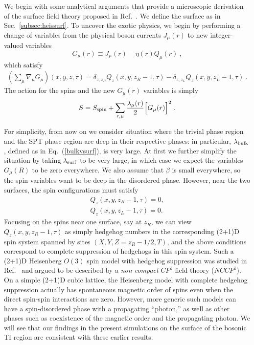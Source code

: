 We begin with some analytical arguments that provide a microscopic derivation of the surface field theory proposed in Ref.~\cite{SenthilVishwanath}.
We define the surface as in Sec.~\ref{subsec:heissurf}. To uncover the exotic physics, we begin by performing a change of variables from the physical boson currents $J_\mu(r)$ to new integer-valued variables
\begin{equation}
G_\mu(r) \equiv J_\mu(r) - \eta(r) Q_\mu(r) ~,
\label{Gchange}
\end{equation}
which satisfy 
\begin{eqnarray*}
\left(\sum_\mu \nabla_\mu G_\mu\right) (x, y, z, \tau) = 
\delta_{z, z_R} Q_z(x, y, z_R-1, \tau) 
- \delta_{z, z_L} Q_z(x, y, z_L-1, \tau) ~. 
\end{eqnarray*}
The action for the spins and the new $G_\mu(r)$ variables is simply
\begin{equation}
S = S_{\rm spin} + \sum_{r,\mu} \frac{\lambda_\mu(r)}{2} \Big[G_\mu(r)\Big]^2 ~.
\end{equation}

For simplicity, from now on we consider situation where the trivial phase region and the SPT phase region are deep in their respective phases: in particular, $\lambda_{\rm bulk}$, defined as in Eq.~(\ref{bulkvsurf}), is very large.  At first we further simplify the situation by taking $\lambda_{\rm surf}$ to be very large, in which case we expect the variables $G_\mu(R)$ to be zero everywhere.  We also assume that $\beta$ is small everywhere, so the spin variables want to be deep in the disordered phase.  However, near the two surfaces, the spin configurations must satisfy
\begin{equation}
\begin{array}{c}
Q_z(x, y, z_R-1, \tau) = 0, \\
Q_z(x, y, z_L-1, \tau) = 0.
\end{array}
\end{equation}
Focusing on the spins near one surface, say at $z_R$, we can view $Q_z(x, y, z_R-1, \tau)$ as simply hedgehog numbers in the corresponding (2+1)D spin system spanned by sites $(X, Y, Z=z_R-1/2, T)$, and the above conditions correspond to complete suppression of hedgehogs in this spin system.  Such a (2+1)D Heisenberg $O(3)$ spin model with hedgehog suppression was studied in Ref.~\cite{LesikAshvin} and argued to be described by a \emph{non-compact} $CP^1$ field theory ($NCCP^1$).  On a simple (2+1)D cubic lattice, the Heisenberg model with complete hedgehog suppression actually has spontaneous magnetic order of spins even when the direct spin-spin interactions are zero.\cite{LauDasgupta, KamalMurthy}  However, more generic such models can have a spin-disordered phase with a propagating ``photon,''\cite{KamalMurthy, LesikAshvin} as well as other phases such as coexistence of the magnetic order and the propagating photon.\cite{LesikAshvin2}  We will see that our findings in the present simulations on the surface of the bosonic TI region are consistent with these earlier results.

